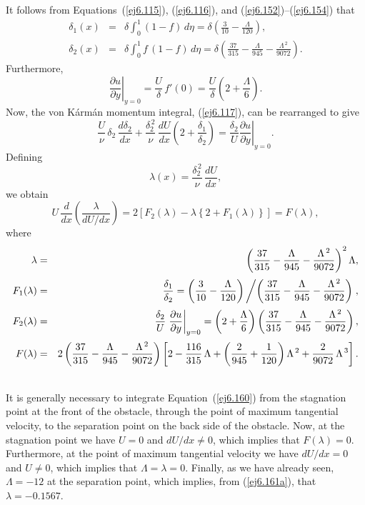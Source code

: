 It follows from Equations~(\ref{ej6.115}), (\ref{ej6.116}), and (\ref{ej6.152})--(\ref{ej6.154}) that
\begin{eqnarray}
\delta_1(x)&=&\delta\int_0^1(1-f)\,d\eta = \delta\left(\frac{3}{10}-\frac{\Lambda}{120}\right),\\[0.5ex]
\delta_2(x)&=&\delta\int_0^1 f\,(1-f)\,d\eta=\delta\left(\frac{37}{315}-\frac{\Lambda}{945}-\frac{\Lambda^{\,2}}{9072}\right).
\end{eqnarray}
Furthermore,
\begin{equation}
\left.\frac{\partial u}{\partial y}\right|_{y=0} = \frac{U}{\delta}\,f'(0) = \frac{U}{\delta}\left(2 + \frac{\Lambda}{6}\right).
\end{equation}
Now, the von K\'{a}rm\'{a}n momentum integral, (\ref{ej6.117}), can be rearranged to give
\begin{equation}\label{ej6.160}
\frac{U}{\nu}\,\delta_2\,\frac{d\delta_2}{dx} +\frac{\delta_2^{\,2}}{\nu}\,\frac{dU}{dx} \left(2+\frac{\delta_1}{\delta_2}\right)
=\frac{\delta_2}{U}\left.\frac{\partial u}{\partial y}\right|_{y=0}.
\end{equation}
Defining
\begin{equation}\label{ej6.159}
\lambda(x) = \frac{\delta_2^{\,2}}{\nu}\,\frac{dU}{dx},
\end{equation}
we obtain
\begin{equation}\label{ej6.160a}
U\,\frac{d}{dx}\!\left(\frac{\lambda}{dU/dx}\right) = 2\left[F_2(\lambda)-\lambda\left\{2+F_1(\lambda)\right\}\right] = F(\lambda),
\end{equation}
where
\begin{eqnarray}\label{ej6.161a}
\lambda &=& \left(\frac{37}{315}-\frac{\Lambda}{945}-\frac{\Lambda^{\,2}}{9072}\right)^2\Lambda,\\[0.5ex]
F_1(\lambda)&=& \frac{\delta_1}{\delta_2} = \left(\frac{3}{10}-\frac{\Lambda}{120}\right)\left/\left(\frac{37}{315}-\frac{\Lambda}{945}-\frac{\Lambda^{\,2}}{9072}\right)\right.,\label{ej6.161}\\[0.5ex]
F_2(\lambda) &=&\frac{\delta_2}{U}\left.\frac{\partial u}{\partial y}\right|_{y=0}=
\left(2+\frac{\Lambda}{6}\right)\left(\frac{37}{315}-\frac{\Lambda}{945}-\frac{\Lambda^{\,2}}{9072}\right),\label{ej6.162}\\[0.5ex]
F(\lambda)&=& 2\left(\frac{37}{315}-\frac{\Lambda}{945}-\frac{\Lambda^{\,2}}{9072}\right)\left[2-
\frac{116}{315}\,\Lambda+\left(\frac{2}{945}+\frac{1}{120}\right)\Lambda^{\,2}+ \frac{2}{9072}\,\Lambda^{\,3}\right].\nonumber\\[0.5ex]&&
\end{eqnarray}
It is generally necessary to integrate Equation~(\ref{ej6.160})  from the stagnation point at the front of the obstacle, through the
point of maximum tangential velocity, to the separation point on the back side of the obstacle. Now, at the
stagnation point we have  $U=0$ and $dU/dx\neq 0$, which implies that $F(\lambda)=0$.  Furthermore, at the point of maximum tangential velocity we have 
$dU/dx=0$ and $U\neq 0$, which implies that $\Lambda=\lambda=0$. Finally, as we have already seen,
$\Lambda=-12$ at the separation point, which implies, from (\ref{ej6.161a}),  that $\lambda=-0.1567$. 

